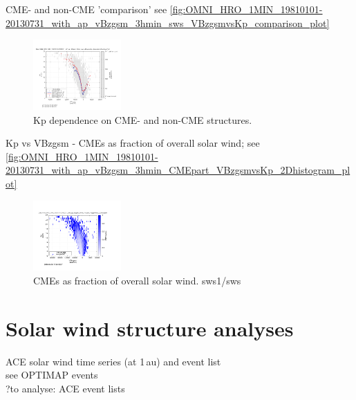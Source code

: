 CME- and non-CME 'comparison' see \autoref{fig:OMNI_HRO_1MIN_19810101-20130731_with_ap_vBzgsm_3hmin_sws_VBzgsmvsKp_comparison_plot}
\begin{figure}[htb]
	\centering
	\includegraphics[width=0.3\textwidth]{images/gnuplots/OMNI_HRO_1MIN_19810101-20130731_with_ap_vBzgsm_3hmin_sws_VBzgsmvsKp_comparison_plot.png}
	\caption{Kp dependence on CME- and non-CME structures.}
	\label{fig:OMNI_HRO_1MIN_19810101-20130731_with_ap_vBzgsm_3hmin_sws_VBzgsmvsKp_comparison_plot}
\end{figure}



Kp vs VBzgsm - CMEs as fraction of overall solar wind; see \autoref{fig:OMNI_HRO_1MIN_19810101-20130731_with_ap_vBzgsm_3hmin_CMEpart_VBzgsmvsKp_2Dhistogram_plot}
\begin{figure}[htb]
	\centering
	\includegraphics[width=0.3\textwidth]{images/gnuplots/OMNI_HRO_1MIN_19810101-20130731_with_ap_vBzgsm_3hmin_CMEpart_VBzgsmvsKp_2Dhistogram_plot.png}
	\caption{CMEs as fraction of overall solar wind. sws1/sws}
	\label{fig:OMNI_HRO_1MIN_19810101-20130731_with_ap_vBzgsm_3hmin_CMEpart_VBzgsmvsKp_2Dhistogram_plot}
\end{figure}


\section{Solar wind structure analyses}

ACE solar wind time series (at 1\,au) and event list\\

see OPTIMAP events\\
?to analyse: ACE event lists\\

